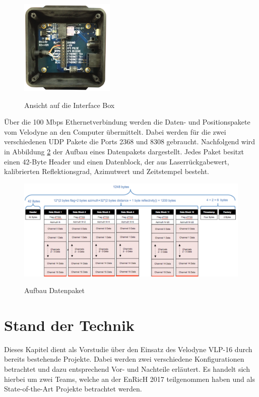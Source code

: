 \begin{figure}[H]
	\centering
	\includegraphics[width=0.4\textwidth]
	{resources/InterfaceBox.PNG}
	\caption[Ansicht auf die Interfacebox]{Ansicht auf die Interface Box} \protect\cite{velodyne}
	\label{fig:InterfaceBox}
\end{figure}

Über die 100 Mbps Ethernetverbindung werden die Daten- und Positionspakete vom Velodyne an den Computer übermittelt. Dabei werden für die zwei verschiedenen \ac{UDP} Pakete die Ports 2368 und 8308 gebraucht. Nachfolgend wird in Abbildung \ref{fig:datapakets} der Aufbau eines Datenpakets dargestellt. Jedes Paket besitzt einen 42-Byte Header und einen Datenblock, der aus Laserrückgabewert, kalibrierten Reflektionsgrad, Azimutwert und Zeitstempel besteht.

\begin{figure}[H]
	\centering
	\includegraphics[width=1.0\textwidth]
	{resources/datapakets.PNG}
	\caption[Aufbau Datenpaket]{Aufbau Datenpaket} \protect\cite{velodyne}
	\label{fig:datapakets}
\end{figure}


\section{Stand der Technik}
 \label{sec:Vorzeigeprojekte}
 Dieses Kapitel dient als Vorstudie über den Einsatz des Velodyne VLP-16 durch bereits bestehende Projekte. Dabei werden zwei verschiedene Konfigurationen betrachtet und dazu entsprechend Vor- und Nachteile erläutert. Es handelt sich hierbei um zwei Teams, welche an der \ac{EnRicH} 2017 teilgenommen haben und als State-of-the-Art Projekte betrachtet werden.
 
